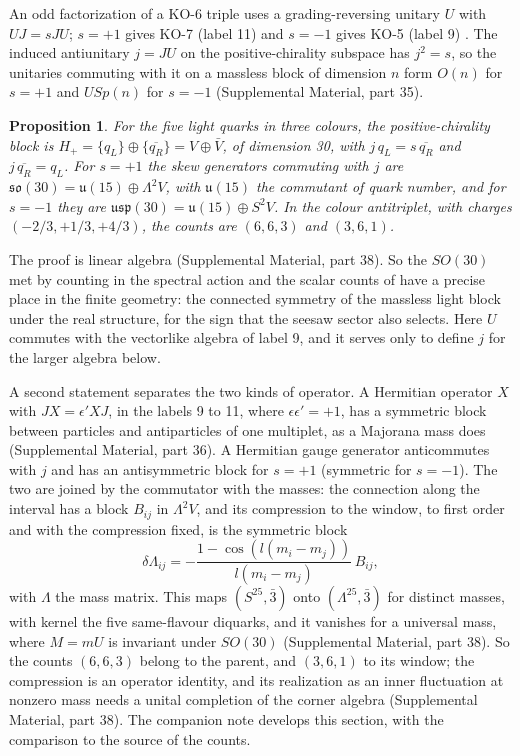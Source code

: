 \documentclass[aps,prd,reprint,onecolumn,nofootinbib,amsmath,amssymb,floatfix]{revtex4-2}
\theoremstyle{plain}
\newtheorem{proposition}{Proposition}
\newcommand{\supp}[1]{Supplemental Material, part #1}
\begin{document}
An odd factorization of a KO-6 triple uses a grading-reversing unitary $U$ with $UJ=sJU$; $s=+1$ gives KO-7 (label 11) and $s=-1$ gives KO-5 (label 9) \cite{towerlesspaper}. The induced antiunitary $j=JU$ on the positive-chirality subspace has $j^2=s$, so the unitaries commuting with it on a massless block of dimension $n$ form $O(n)$ for $s=+1$ and $USp(n)$ for $s=-1$ (\supp{35}).

\begin{proposition}\label{prop:so30}
For the five light quarks in three colours, the positive-chirality block is $H_+=\{q_L\}\oplus\{\overline{q_R}\}=V\oplus\bar V$, of dimension 30, with $j\,q_L=s\,\overline{q_R}$ and $j\,\overline{q_R}=q_L$. For $s=+1$ the skew generators commuting with $j$ are $\mathfrak{so}(30)=\mathfrak u(15)\oplus\Lambda^2V$, with $\mathfrak u(15)$ the commutant of quark number, and for $s=-1$ they are $\mathfrak{usp}(30)=\mathfrak u(15)\oplus S^2V$. In the colour antitriplet, with charges $(-2/3,+1/3,+4/3)$, the counts are $(6,6,3)$ and $(3,6,1)$.
\end{proposition}

The proof is linear algebra (\supp{38}). So the $SO(30)$ met by counting in the spectral action \cite{towerlesspaper} and the scalar counts of \cite{Rivero2005} have a precise place in the finite geometry: the connected symmetry of the massless light block under the real structure, for the sign that the seesaw sector also selects. Here $U$ commutes with the vectorlike algebra of label 9, and it serves only to define $j$ for the larger algebra below.

A second statement separates the two kinds of operator. A Hermitian operator $X$ with $JX=\epsilon'XJ$, in the labels 9 to 11, where $\epsilon\epsilon'=+1$, has a symmetric block between particles and antiparticles of one multiplet, as a Majorana mass does (\supp{36}). A Hermitian gauge generator anticommutes with $j$ and has an antisymmetric block for $s=+1$ (symmetric for $s=-1$). The two are joined by the commutator with the masses: the connection along the interval has a block $B_{ij}$ in $\Lambda^2V$, and its compression to the window, to first order and with the compression fixed, is the symmetric block
\begin{equation}\label{eq:shadow}
\delta\Lambda_{ij}=-\frac{1-\cos(l(m_i-m_j))}{l(m_i-m_j)}\,B_{ij},
\end{equation}
with $\Lambda$ the mass matrix. This maps $(S^25,\bar3)$ onto $(\Lambda^25,\bar3)$ for distinct masses, with kernel the five same-flavour diquarks, and it vanishes for a universal mass, where $M=mU$ is invariant under $SO(30)$ (\supp{38}). So the counts $(6,6,3)$ belong to the parent, and $(3,6,1)$ to its window; the compression is an operator identity, and its realization as an inner fluctuation at nonzero mass needs a unital completion of the corner algebra (\supp{38}). The companion note \cite{realnote} develops this section, with the comparison to the source of the counts.
\end{document}
